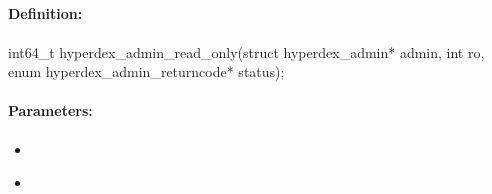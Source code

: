 %
%
%


\pagebreak
\subsection{}
\label{api:c:read_only}


\paragraph{Definition:}
\begin{ccode}
int64_t hyperdex_admin_read_only(struct hyperdex_admin* admin,
        int ro,
        enum hyperdex_admin_returncode* status);
\end{ccode}

\paragraph{Parameters:}
\begin{itemize}[noitemsep]
\item {}\\

\item {}\\

\end{itemize}

